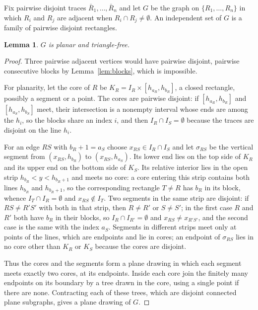 \documentclass[11pt]{article}
\newtheorem{lemma}[theorem]{Lemma}
\theoremstyle{remark}
\begin{document}
Fix pairwise disjoint traces $\bar R_1,\dots,\bar R_n$ and let $G$ be the graph on $\{R_1,\dots,R_n\}$ in which $R_i$ and $R_j$ are adjacent when $R_i\cap R_j\ne\emptyset$. An independent set of $G$ is a family of pairwise disjoint rectangles.

\begin{lemma}\label{lem:planar}
$G$ is planar and triangle-free.
\end{lemma}

\begin{proof}
Three pairwise adjacent vertices would have pairwise disjoint, pairwise consecutive blocks by Lemma~\ref{lem:blocks}, which is impossible.

For planarity, let the core of $R$ be $K_R=I_R\times[h_{a_R},h_{b_R}]$, a closed rectangle, possibly a segment or a point. The cores are pairwise disjoint: if $[h_{a_R},h_{b_R}]$ and $[h_{a_S},h_{b_S}]$ meet, their intersection is a nonempty interval whose ends are among the $h_i$, so the blocks share an index $i$, and then $I_R\cap I_S=\emptyset$ because the traces are disjoint on the line $h_i$.

For an edge $RS$ with $b_R+1=a_S$ choose $x_{RS}\in I_R\cap I_S$ and let $\sigma_{RS}$ be the vertical segment from $(x_{RS},h_{b_R})$ to $(x_{RS},h_{a_S})$. Its lower end lies on the top side of $K_R$ and its upper end on the bottom side of $K_S$. Its relative interior lies in the open strip $h_{b_R}<y<h_{b_R+1}$ and meets no core: a core entering this strip contains both lines $h_{b_R}$ and $h_{b_R+1}$, so the corresponding rectangle $T\ne R$ has $b_R$ in its block, whence $I_T\cap I_R=\emptyset$ and $x_{RS}\notin I_T$. Two segments in the same strip are disjoint: if $RS\ne R'S'$ with both in that strip, then $R\ne R'$ or $S\ne S'$; in the first case $R$ and $R'$ both have $b_R$ in their blocks, so $I_R\cap I_{R'}=\emptyset$ and $x_{RS}\ne x_{R'S'}$, and the second case is the same with the index $a_S$. Segments in different strips meet only at points of the lines, which are endpoints and lie in cores; an endpoint of $\sigma_{RS}$ lies in no core other than $K_R$ or $K_S$ because the cores are disjoint.

Thus the cores and the segments form a plane drawing in which each segment meets exactly two cores, at its endpoints. Inside each core join the finitely many endpoints on its boundary by a tree drawn in the core, using a single point if there are none. Contracting each of these trees, which are disjoint connected plane subgraphs, gives a plane drawing of $G$.
\end{proof}
\end{document}
